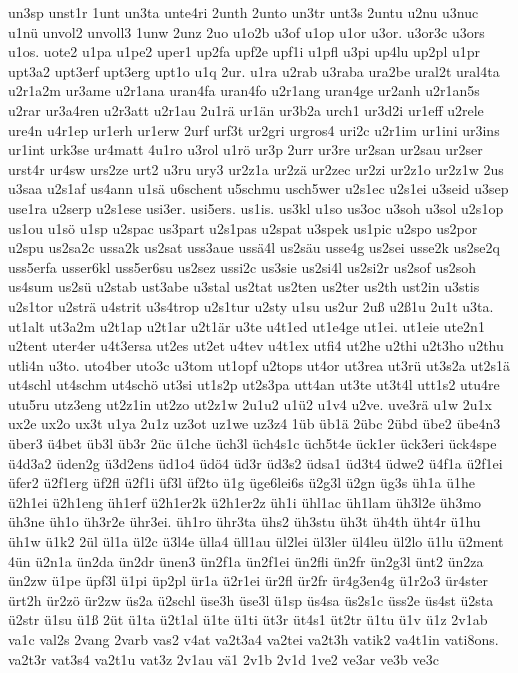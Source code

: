 {un3sp
unst1r
1unt
un3ta
unte4ri
2unth
2unto
un3tr
unt3s
2untu
u2nu
u3nuc
u1nü
unvol2
unvoll3
1unw
2unz
2uo
u1o2b
u3of
u1op
u1or
u3or.
u3or3c
u3ors
u1os.
uote2
u1pa
u1pe2
uper1
up2fa
upf2e
upf1i
u1pfl
u3pi
up4lu
up2pl
u1pr
upt3a2
upt3erf
upt3erg
upt1o
u1q
2ur.
u1ra
u2rab
u3raba
ura2be
ural2t
ural4ta
u2r1a2m
ur3ame
u2r1ana
uran4fa
uran4fo
u2r1ang
uran4ge
ur2anh
u2r1an5s
u2rar
ur3a4ren
u2r3att
u2r1au
2u1rä
ur1än
ur3b2a
urch1
ur3d2i
ur1eff
u2rele
ure4n
u4r1ep
ur1erh
ur1erw
2urf
urf3t
ur2gri
urgros4
uri2c
u2r1im
ur1ini
ur3ins
ur1int
urk3se
ur4matt
4u1ro
u3rol
u1rö
ur3p
2urr
ur3re
ur2san
ur2sau
ur2ser
urst4r
ur4sw
urs2ze
urt2
u3ru
ury3
ur2z1a
ur2zä
ur2zec
ur2zi
ur2z1o
ur2z1w
2us
u3saa
u2s1af
us4ann
u1sä
u6schent
u5schmu
usch5wer
u2s1ec
u2s1ei
u3seid
u3sep
use1ra
u2serp
u2s1ese
usi3er.
usi5ers.
us1is.
us3kl
u1so
us3oc
u3soh
u3sol
u2s1op
us1ou
u1sö
u1sp
u2spac
us3part
u2s1pas
u2spat
u3spek
us1pic
u2spo
us2por
u2spu
us2sa2c
ussa2k
us2sat
uss3aue
ussä4l
us2säu
usse4g
us2sei
usse2k
us2se2q
uss5erfa
usser6kl
uss5er6su
us2sez
ussi2c
us3sie
us2si4l
us2si2r
us2sof
us2soh
us4sum
us2sü
u2stab
ust3abe
u3stal
us2tat
us2ten
us2ter
us2th
ust2in
u3stis
u2s1tor
u2strä
u4strit
u3s4trop
u2s1tur
u2sty
u1su
us2ur
2uß
u2ß1u
2u1t
u3ta.
ut1alt
ut3a2m
u2t1ap
u2t1ar
u2t1är
u3te
u4t1ed
ut1e4ge
ut1ei.
ut1eie
ute2n1
u2tent
uter4er
u4t3ersa
ut2es
ut2et
u4tev
u4t1ex
utfi4
ut2he
u2thi
u2t3ho
u2thu
utli4n
u3to.
uto4ber
uto3c
u3tom
ut1opf
u2tops
ut4or
ut3rea
ut3rü
ut3s2a
ut2s1ä
ut4schl
ut4schm
ut4schö
ut3si
ut1s2p
ut2s3pa
utt4an
ut3te
ut3t4l
utt1s2
utu4re
utu5ru
utz3eng
ut2z1in
ut2zo
ut2z1w
2u1u2
u1ü2
u1v4
u2ve.
uve3rä
u1w
2u1x
ux2e
ux2o
ux3t
u1ya
2u1z
uz3ot
uz1we
uz3z4
1üb
üb1ä
2übc
2übd
übe2
übe4n3
über3
ü4bet
üb3l
üb3r
2üc
ü1che
üch3l
üch4s1c
üch5t4e
ück1er
ück3eri
ück4spe
ü4d3a2
üden2g
ü3d2ens
üd1o4
üdö4
üd3r
üd3s2
üdsa1
üd3t4
üdwe2
ü4f1a
ü2f1ei
üfer2
ü2f1erg
üf2fl
ü2f1i
üf3l
üf2to
ü1g
üge6lei6s
ü2g3l
ü2gn
üg3s
üh1a
ü1he
ü2h1ei
ü2h1eng
üh1erf
ü2h1er2k
ü2h1er2z
üh1i
ühl1ac
üh1lam
üh3l2e
üh3mo
üh3ne
üh1o
üh3r2e
ühr3ei.
üh1ro
ühr3ta
ühs2
üh3stu
üh3t
üh4th
üht4r
ü1hu
üh1w
ü1k2
2ül
ül1a
ül2c
ü3l4e
ülla4
üll1au
ül2lei
ül3ler
ül4leu
ül2lo
ü1lu
ü2ment
4ün
ü2n1a
ün2da
ün2dr
ünen3
ün2f1a
ün2f1ei
ün2fli
ün2fr
ün2g3l
ünt2
ün2za
ün2zw
ü1pe
üpf3l
ü1pi
üp2pl
ür1a
ü2r1ei
ür2fl
ür2fr
ür4g3en4g
ü1r2o3
ür4ster
ürt2h
ür2zö
ür2zw
üs2a
ü2schl
üse3h
üse3l
ü1sp
üs4sa
üs2s1c
üss2e
üs4st
ü2sta
ü2str
ü1su
ü1ß
2üt
ü1ta
ü2t1al
ü1te
ü1ti
üt3r
üt4s1
üt2tr
ü1tu
ü1v
ü1z
2v1ab
va1c
val2s
2vang
2varb
vas2
v4at
va2t3a4
va2tei
va2t3h
vatik2
va4t1in
vati8ons.
va2t3r
vat3s4
va2t1u
vat3z
2v1au
vä1
2v1b
2v1d
1ve2
ve3ar
ve3b
ve3c
}
